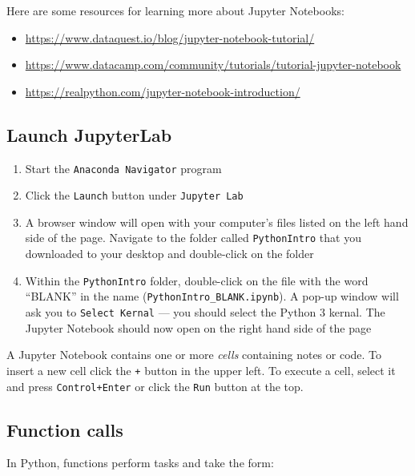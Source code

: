 \documentclass[
]{book}
\providecommand{\tightlist}{%
  \setlength{\itemsep}{0pt}\setlength{\parskip}{0pt}}
\begin{document}
Here are some resources for learning more about Jupyter Notebooks:

\begin{itemize}
\tightlist
\item
  \url{https://www.dataquest.io/blog/jupyter-notebook-tutorial/}
\item
  \url{https://www.datacamp.com/community/tutorials/tutorial-jupyter-notebook}
\item
  \url{https://realpython.com/jupyter-notebook-introduction/}
\end{itemize}

\hypertarget{launch-jupyterlab-1}{%
\subsection{Launch JupyterLab}\label{launch-jupyterlab-1}}

\begin{enumerate}
\def\labelenumi{\arabic{enumi}.}
\tightlist
\item
  Start the \texttt{Anaconda\ Navigator} program
\item
  Click the \texttt{Launch} button under \texttt{Jupyter\ Lab}
\item
  A browser window will open with your computer's files listed on the left hand side of the page. Navigate to the folder called \texttt{PythonIntro} that you downloaded to your desktop and double-click on the folder
\item
  Within the \texttt{PythonIntro} folder, double-click on the file with the word ``BLANK'' in the name (\texttt{PythonIntro\_BLANK.ipynb}). A pop-up window will ask you to \texttt{Select\ Kernal} --- you should select the Python 3 kernal. The Jupyter Notebook should now open on the right hand side of the page
\end{enumerate}

A Jupyter Notebook contains one or more \emph{cells} containing notes or code. To insert a new cell click the \texttt{+} button in the upper left. To execute a cell, select it and press \texttt{Control+Enter} or click the \texttt{Run} button at the top.

\hypertarget{function-calls-1}{%
\subsection{Function calls}\label{function-calls-1}}

In Python, functions perform tasks and take the form:
\end{document}
